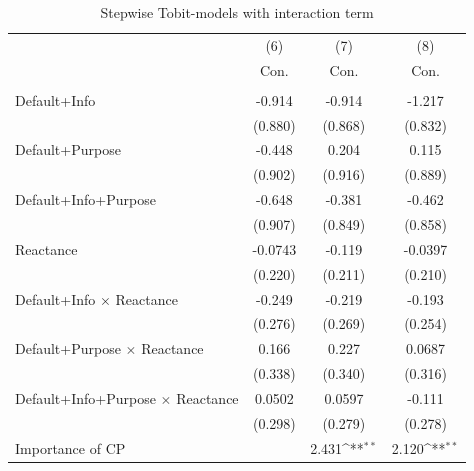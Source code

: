 \documentclass[review, authoryear,12pt]{elsarticle}
\begin{document}
\begin{table}[htbp]\centering
\begin{adjustbox}{max width=\textwidth}
\def\sym#1{\ifmmode^{#1}\else\(^{#1}\)\fi}
\caption{Stepwise Tobit-models with interaction term \label{tab6}}
\begin{tabular}{l*{3}{c}}
\hline\hline
                    &\multicolumn{1}{c}{(6)}&\multicolumn{1}{c}{(7)}&\multicolumn{1}{c}{(8)}\\
                    &\multicolumn{1}{c}{Con.}&\multicolumn{1}{c}{Con.}&\multicolumn{1}{c}{Con.}\\
\hline
               &                     &                     &                     \\
Default+Info        &      -0.914         &      -0.914         &      -1.217         \\
                    &     (0.880)         &     (0.868)         &     (0.832)         \\
Default+Purpose     &      -0.448         &       0.204         &       0.115         \\
                    &     (0.902)         &     (0.916)         &     (0.889)         \\
Default+Info+Purpose&      -0.648         &      -0.381         &      -0.462         \\
                    &     (0.907)         &     (0.849)         &     (0.858)         \\
Reactance          &     -0.0743         &      -0.119         &     -0.0397         \\
                    &     (0.220)         &     (0.211)         &     (0.210)         \\
Default+Info $\times$ Reactance&      -0.249         &      -0.219         &      -0.193         \\
                    &     (0.276)         &     (0.269)         &     (0.254)         \\
Default+Purpose $\times$ Reactance&       0.166         &       0.227         &      0.0687         \\
                    &     (0.338)         &     (0.340)         &     (0.316)         \\
Default+Info+Purpose $\times$ Reactance&      0.0502         &      0.0597         &      -0.111         \\
                    &     (0.298)         &     (0.279)         &     (0.278)         \\
Importance of CP       &                     &       2.431\sym{**} &       2.120\sym{**} \\

\end{tabular}
\end{adjustbox}
\end{table}
\end{document}

